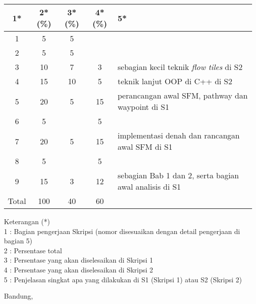 \documentclass[a4paper,twoside]{article}
\begin{document}
\begin{center}
  \begin{tabular}{ | c | c | c | c | l |}
    \hline
    1*  & 2*(\%) & 3*(\%) & 4*(\%) &5*\\ \hline \hline
    1   & 5  & 5  &  &  \\ \hline
    2   & 5 & 5  &   & \\ \hline
    3   & 10  & 7  & 3 & {\footnotesize sebagian kecil teknik {\it flow tiles} di S2}  \\ \hline
    4   & 15  & 10  &  5 & {\footnotesize teknik lanjut OOP di C++ di S2} \\ \hline
    5   & 20  & 5  & 15 & {\footnotesize perancangan awal SFM, pathway dan waypoint di S1} \\ \hline
    6   & 5 &   & 5  & \\ \hline
    7   & 20  & 5  & 15 &  {\footnotesize implementasi denah dan rancangan awal SFM di S1}\\ \hline
    8   & 5  &   &  5  & \\ \hline
    9   & 15  & 3  & 12  & {\footnotesize sebagian Bab 1 dan 2, serta bagian awal analisis di S1}\\ \hline
    Total  & 100  & 40  & 60 &  \\ \hline
                          \end{tabular}
\end{center}

Keterangan (*)\\
1 : Bagian pengerjaan Skripsi (nomor disesuaikan dengan detail pengerjaan di bagian 5)\\
2 : Persentase total \\
3 : Persentase yang akan diselesaikan di Skripsi 1 \\
4 : Persentase yang akan diselesaikan di Skripsi 2 \\
5 : Penjelasan singkat apa yang dilakukan di S1 (Skripsi 1) atau S2 (Skripsi 2)

\vspace{1cm}
\centering Bandung, \tanggal\\
\vspace{2cm} \nama \\ 
\vspace{1cm}
\end{document}
